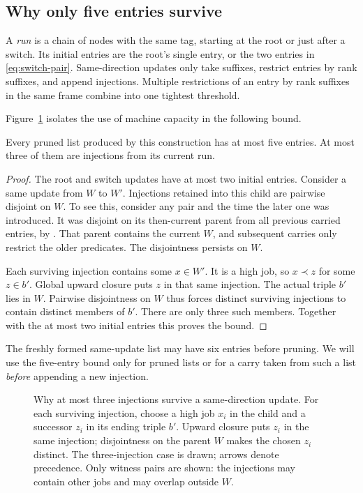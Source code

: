 \subsection{Why only five entries survive}

A \emph{run} is a chain of nodes with the same tag, starting at the
root or just after a switch. Its initial entries are the root's
single entry, or the two entries in \eqref{eq:switch-pair}.
Same-direction updates only take suffixes, restrict entries by rank
suffixes, and append injections. Multiple restrictions of an entry
by rank suffixes in the same frame combine into one tightest threshold.

Figure~\ref{fig:capacity-three} isolates the use of machine capacity
in the following bound.

\begin{lemma}\label{lem:list-length}
Every pruned list produced by this construction has at most five entries.
At most three of them are injections from its current run.
\end{lemma}
\begin{proof}
The root and switch updates have at most two initial entries.
Consider a same update from \(W\) to \(W'\).
Injections retained into this child are pairwise disjoint on \(W\).
To see this, consider any pair and the time the later one was
introduced. It was disjoint on its then-current parent from all
previous carried entries, by .
That parent contains the current \(W\), and subsequent carries
only restrict the older predicates. The disjointness persists on \(W\).

Each surviving injection contains some \(x\in W'\).
It is a high job, so \(x\prec z\) for some \(z\in b'\).
Global upward closure puts \(z\) in that same injection.
The actual triple \(b'\) lies in \(W\). Pairwise disjointness on
\(W\) thus forces distinct surviving injections to contain distinct
members of \(b'\). There are only three such members.
Together with the at most two initial entries this proves the bound.
\end{proof}

The freshly formed same-update list may have six entries before
pruning. We will use the five-entry bound only for pruned lists
or for a carry taken from such a list \emph{before} appending a
new injection.

\begin{figure}[t]
\centering

\caption{Why at most three injections survive a same-direction update.
For each surviving injection, choose a high job $x_i$ in the child
and a successor $z_i$ in its ending triple $b'$.
Upward closure puts $z_i$ in the same injection; disjointness on the
parent $W$ makes the chosen $z_i$ distinct.
The three-injection case is drawn; arrows denote precedence.
Only witness pairs are shown:
the injections may contain other jobs and may overlap outside $W$.}
\label{fig:capacity-three}
\end{figure}


